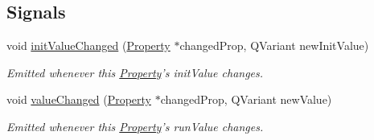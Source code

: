 \subsection*{Signals}
\begin{DoxyCompactItemize}
\item 
\hypertarget{class_picto_1_1_property_a2139fa411763c70319f66099158e22ed}{void \hyperlink{class_picto_1_1_property_a2139fa411763c70319f66099158e22ed}{init\-Value\-Changed} (\hyperlink{class_picto_1_1_property}{Property} $\ast$changed\-Prop, Q\-Variant new\-Init\-Value)}\label{class_picto_1_1_property_a2139fa411763c70319f66099158e22ed}

\begin{DoxyCompactList}\small\item\em Emitted whenever this \hyperlink{class_picto_1_1_property}{Property}'s init\-Value changes. \end{DoxyCompactList}\item 
\hypertarget{class_picto_1_1_property_afd9c8c1109c94b6817f962291806da38}{void \hyperlink{class_picto_1_1_property_afd9c8c1109c94b6817f962291806da38}{value\-Changed} (\hyperlink{class_picto_1_1_property}{Property} $\ast$changed\-Prop, Q\-Variant new\-Value)}\label{class_picto_1_1_property_afd9c8c1109c94b6817f962291806da38}

\begin{DoxyCompactList}\small\item\em Emitted whenever this \hyperlink{class_picto_1_1_property}{Property}'s run\-Value changes. \end{DoxyCompactList}\end{DoxyCompactItemize}
